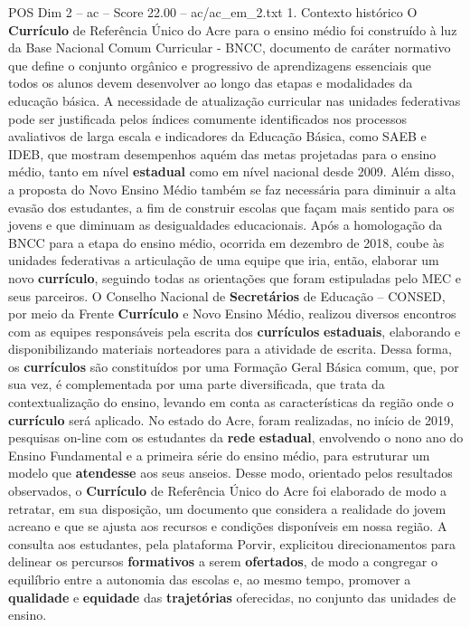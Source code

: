 \begin{textsample}{POS Dim 2 – ac – Score 22.00 – ac/ac\_em\_2.txt}  \label{ex:f2_pos_170}
1.
Contexto histórico O \textbf{Currículo} de Referência Único do Acre para o ensino médio foi construído à luz da Base Nacional Comum Curricular - BNCC, documento de caráter normativo que define o conjunto orgânico e progressivo de aprendizagens essenciais que todos os alunos devem desenvolver ao longo das etapas e modalidades da educação básica.
A necessidade de atualização curricular nas unidades federativas pode ser justificada pelos índices comumente identificados nos processos avaliativos de larga escala e indicadores da Educação Básica, como SAEB e IDEB, que mostram desempenhos aquém das metas projetadas para o ensino médio, tanto em nível \textbf{estadual} como em nível nacional desde 2009.
Além disso, a proposta do Novo Ensino Médio também se faz necessária para diminuir a alta evasão dos estudantes, a fim de construir escolas que façam mais sentido para os jovens e que diminuam as desigualdades educacionais.
Após a homologação da BNCC para a etapa do ensino médio, ocorrida em dezembro de 2018, coube às unidades federativas a articulação de uma equipe que iria, então, elaborar um novo \textbf{currículo}, seguindo todas as orientações que foram estipuladas pelo MEC e seus parceiros.
O Conselho Nacional de \textbf{Secretários} de Educação – CONSED, por meio da Frente \textbf{Currículo} e Novo Ensino Médio, realizou diversos encontros com as equipes responsáveis pela escrita dos \textbf{currículos} \textbf{estaduais}, elaborando e disponibilizando materiais norteadores para a atividade de escrita.
Dessa forma, os \textbf{currículos} são constituídos por uma Formação Geral Básica comum, que, por sua vez, é complementada por uma parte diversificada, que trata da contextualização do ensino, levando em conta as características da região onde o \textbf{currículo} será aplicado.
No estado do Acre, foram realizadas, no início de 2019, pesquisas on-line com os estudantes da \textbf{rede} \textbf{estadual}, envolvendo o nono ano do Ensino Fundamental e a primeira série do ensino médio, para estruturar um modelo que \textbf{atendesse} aos seus anseios.
Desse modo, orientado pelos resultados observados, o \textbf{Currículo} de Referência Único do Acre foi elaborado de modo a retratar, em sua disposição, um documento que considera a realidade do jovem acreano e que se ajusta aos recursos e condições disponíveis em nossa região.
A consulta aos estudantes, pela plataforma Porvir, explicitou direcionamentos para delinear os percursos \textbf{formativos} a serem \textbf{ofertados}, de modo a congregar o equilíbrio entre a autonomia das escolas e, ao mesmo tempo, promover a \textbf{qualidade} e \textbf{equidade} das \textbf{trajetórias} oferecidas, no conjunto das unidades de ensino.

\end{textsample}
